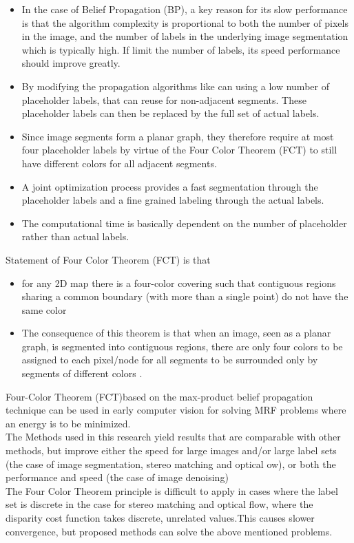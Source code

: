  \begin{itemize}
   \item In the case of Belief Propagation (BP), a key reason for its slow performance is that the algorithm complexity is proportional to both the number
of pixels in the image, and the number of labels in the underlying image segmentation
which is typically high. If  limit the number of labels, its speed performance should improve greatly.
   \item
By modifying the propagation algorithms like can using a low number of placeholder
labels, that can reuse for non-adjacent segments. These placeholder labels
can then be replaced by the full set of actual labels.
   \item Since image segments
form a planar graph, they therefore require at most four placeholder labels by
virtue of the Four Color Theorem (FCT)  to still have different colors for
all adjacent segments.
 \item A joint optimization process provides a fast segmentation
through the placeholder labels and a fine grained labeling through the
actual labels.
 \item  The computational time is basically dependent on the number
of placeholder rather than actual labels.
 \end{itemize}
 Statement of Four Color Theorem (FCT) is that\begin{itemize}
                                                \item for any 2D map there is a four-color covering such
that contiguous regions sharing a common boundary (with more than a single
point) do not have the same color
                                                \item The consequence of this theorem is that when
an image, seen as a planar graph, is segmented into contiguous regions, there
are only four colors to be assigned to each pixel/node for all segments to be
surrounded only by segments of different colors .
                                              \end{itemize}

 Four-Color Theorem (FCT)based on the max-product
belief propagation technique can be used in early computer vision for solving
MRF problems where an energy is to be minimized.
\\The  Methods used in this research yield results that are comparable with other methods, but improve either the
speed for large images and/or large label sets (the case of image segmentation,
stereo matching and optical ow), or both the performance and speed (the
case of image denoising)
\\The Four Color Theorem principle is difficult to apply in cases where
the label set is discrete in the case for stereo matching and optical flow, where the
disparity cost function takes discrete, unrelated values.This causes slower
convergence, but proposed methods can solve  the above mentioned problems.





